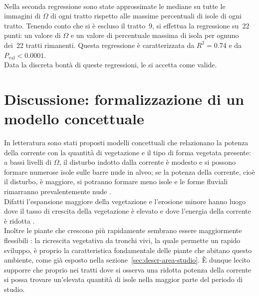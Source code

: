 \\
Nella seconda regressione sono state approssimate le mediane su tutte le immagini di $\Omega$ di ogni tratto rispetto alle massime percentuali di isole di ogni tratto. Tenendo conto che si è escluso il tratto~9, si effettua la regressione su~22 punti: un valore di $\Omega$ e un valore di percentuale massima di isola per ognuno dei~22 tratti rimanenti.
Questa regressione è caratterizzata da $R^2 = 0.74$ e da $P_\mathrm{val} < 0.0001$.
\\
Data la discreta bontà di queste regressioni, le si accetta come valide.

\section{Discussione: formalizzazione di un modello concettuale}
In letteratura sono stati proposti modelli concettuali che relazionano la potenza della corrente con la quantità di vegetazione e il tipo di forma vegetata presente:
a bassi livelli di $\Omega$, il disturbo indotto dalla corrente è modesto e si possono formare numerose isole sulle barre nude in alveo;
se la potenza della corrente, cioè il disturbo, è maggiore, si potranno formare meno isole e le forme fluviali rimarranno prevalentemente nude .
\\
Difatti l'espansione maggiore della vegetazione e l'erosione minore hanno luogo dove il tasso di crescita della vegetazione è elevato e dove l'energia della corrente è ridotta .
\\
Inoltre le piante che crescono più rapidamente sembrano essere maggiormente flessibili : la ricrescita vegetativa da tronchi vivi, la quale permette un rapido sviluppo, è proprio la caratteristica fondamentale delle piante che abitano questo ambiente, come già esposto nella sezione~\ref{sec:descr-area-studio}.
È dunque lecito supporre che proprio nei tratti dove si osserva una ridotta potenza della corrente si possa trovare un'elevata quantità di isole nella maggior parte del periodo di studio.

